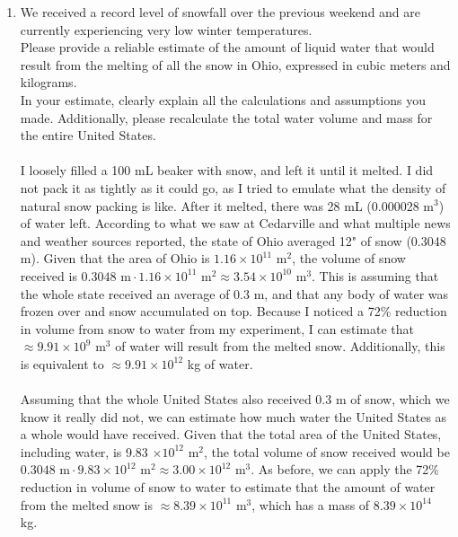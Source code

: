 \documentclass[12pt]{article}
\begin{document}
\begin{enumerate}
	\item We received a record level of snowfall over the previous weekend and are currently experiencing very low winter temperatures.\\
	Please provide a reliable estimate of the amount of liquid water that would result from the melting of all the snow in Ohio, expressed in cubic meters and kilograms.\\
	In your estimate, clearly explain all the calculations and assumptions you made. Additionally, please recalculate the total water volume and mass for the entire United States.\\\\
	I loosely filled a 100 mL beaker with snow, and left it until it melted. I did not pack it as tightly as it could go, as I tried to emulate what the density of natural snow packing is like. After it melted, there was 28 mL (0.000028 m$^3$) of water left. According to what we saw at Cedarville and what multiple news and weather sources reported, the state of Ohio averaged 12" of snow (0.3048 m). Given that the area of Ohio is $1.16\times 10^{11}$ m$^2$, the volume of snow received is $0.3048 \mbox{ m} \cdot 1.16 \times 10^{11} \mbox{ m}^2\approx 3.54 \times 10^{10}$ m$^3$. This is assuming that the whole state received an average of 0.3 m, and that any body of water was frozen over and snow accumulated on top. Because I noticed a 72\% reduction in volume from snow to water from my experiment, I can estimate that $\approx 9.91 \times 10^9$ m$^3$ of water will result from the melted snow. Additionally, this is equivalent to $\approx 9.91 \times 10^{12}$ kg of water.\\\\
	Assuming that the whole United States also received 0.3 m of snow, which we know it really did not, we can estimate how much water the United States as a whole would have received. Given that the total area of the United States, including water, is 9.83 $\times 10^{12}$ m$^2$, the total volume of snow received would be $0.3048 \mbox{ m} \cdot 9.83 \times 10^{12} \mbox{ m}^2\approx 3.00 \times 10^{12}$ m$^3$. As before, we can apply the 72\% reduction in volume of snow to water to estimate that the amount of water from the melted snow is $\approx 8.39 \times 10^{11}$ m$^3$, which has a mass of $8.39 \times 10^{14}$ kg.

\end{enumerate}
\end{document}
